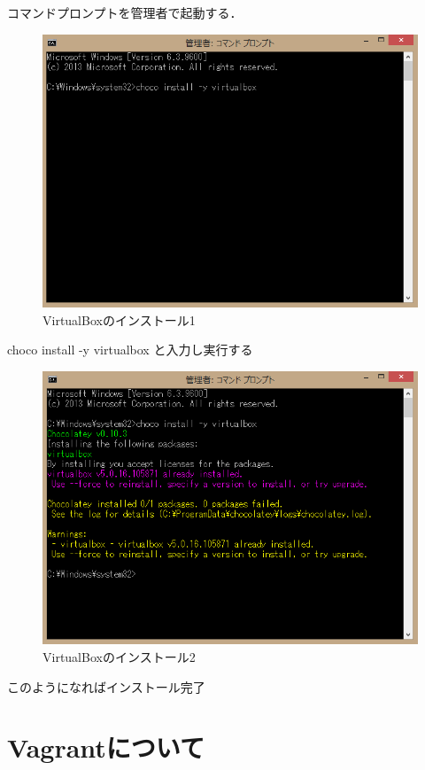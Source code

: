 コマンドプロンプトを管理者で起動する．


\begin{figure}[h]
\centering
\includegraphics[width=12cm]{virtualbox2.PNG}
\caption{VirtualBoxのインストール1}\label{サンプル図}
\end{figure}

\newpage


choco install -y virtualbox と入力し実行する

\begin{figure}[h]
\centering
\includegraphics[width=12cm]{virtualbox3.PNG}
\caption{VirtualBoxのインストール2}\label{サンプル図}
\end{figure}

このようになればインストール完了

\newpage

\section{Vagrantについて}

